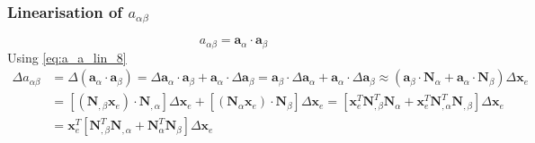 \documentclass[../main.tex]{subfiles}
\begin{document}
\begin{appendices}
\subsubsection{Linearisation of \texorpdfstring{$a_{\alpha \beta}$}{a-ab}} 
\begin{equation}\label{eq:del_aab_1}
    a_{\alpha \beta} = \boldsymbol{a}_{\alpha} \cdot \boldsymbol{a}_{\beta}
\end{equation}
Using \eqref{eq:a_a_lin_8}
\begin{equation}\label{eq:del_aab_2}
    \begin{split}
        \Delta a_{\alpha \beta} &= \Delta \left( \boldsymbol{a}_{\alpha} \cdot \boldsymbol{a}_{\beta} \right) = \Delta \boldsymbol{a}_{\alpha} \cdot \boldsymbol{a}_{\beta} + \boldsymbol{a}_{\alpha} \cdot \Delta \boldsymbol{a}_{\beta} = \boldsymbol{a}_{\beta} \cdot \Delta \boldsymbol{a}_{\alpha} + \boldsymbol{a}_{\alpha} \cdot \Delta \boldsymbol{a}_{\beta} \approx \left( \boldsymbol{a}_{\beta} \cdot \mathbf{N}_{\alpha} + \boldsymbol{a}_{\alpha} \cdot \mathbf{N}_{\beta} \right) \Delta \mathbf{x}_{e} \\ &= \left[ \left( \mathbf{N}_{, \beta} \mathbf{x}_{e} \right) \cdot \mathbf{N}_{, \alpha} \right] \Delta \mathbf{x}_{e} + \left[ \left( \mathbf{N}_{\alpha} \mathbf{x}_{e} \right) \cdot \mathbf{N}_{\beta} \right] \Delta \mathbf{x}_{e} = \left[ \mathbf{x}_{e}^{T} \mathbf{N}_{, \beta}^{T} \mathbf{N}_{\alpha} + \mathbf{x}_{e}^{T} \mathbf{N}_{, \alpha}^{T} \mathbf{N}_{, \beta} \right] \Delta \mathbf{x}_{e} \\ &= \mathbf{x}_{e}^{T} \left[ \mathbf{N}_{, \beta}^{T} \mathbf{N}_{, \alpha} + \mathbf{N}_{\alpha}^{T} \mathbf{N}_{\beta} \right] \Delta \mathbf{x}_{e}
    \end{split}
\end{equation}


\end{appendices}
\end{document}
